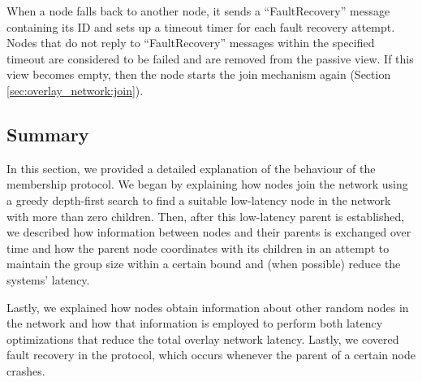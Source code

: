 When a node falls back to another node, it sends a ``FaultRecovery'' message containing its ID and sets up a timeout timer for each fault recovery attempt. Nodes that do not reply to ``FaultRecovery'' messages within the specified timeout are considered to be failed and are removed from the passive view. If this view becomes empty, then the node starts the join mechanism again (Section \ref{sec:overlay_network:join}).

\subsection{Summary}

In this section, we provided a detailed explanation of the behaviour of the membership protocol. We began by explaining how nodes join the network using a greedy depth-first search to find a suitable low-latency node in the network with more than zero children. Then, after this low-latency parent is established, we described how information between nodes and their parents is exchanged over time and how the parent node coordinates with its children in an attempt to maintain the group size within a certain bound and (when possible) reduce the systems' latency.

Lastly, we explained how nodes obtain information about other random nodes in the network and how that information is employed to perform both latency optimizations that reduce the total overlay network latency. Lastly, we covered fault recovery in the protocol, which occurs whenever the parent of a certain node crashes.